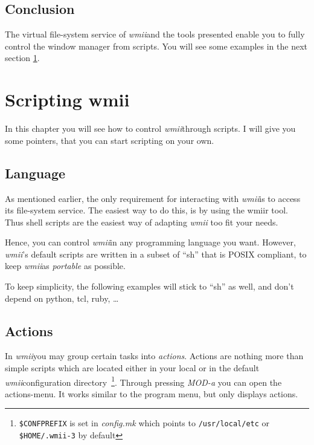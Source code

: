 \documentclass[12pt,a4paper]{article} %
\newcommand{\wmii}{\emph{wmii}}
\begin{document}
    \subsection{Conclusion}

    The virtual file-system service of \wmii and the tools presented enable
    you to fully control the window manager from scripts.
    You will see some examples in the next section
    \ref{sec:scripting}.

    \section{Scripting wmii}
    \label{sec:scripting}

    In this chapter you will see how to control \wmii through scripts. I will
    give you some pointers, that you can start scripting on your own.

    \subsection{Language}

    As mentioned earlier, the only requirement for interacting with \wmii is to
    access its file-system service. The easiest way to do this, is by using
    the wmiir tool. Thus shell scripts are the easiest way of adapting \wmii
    too fit your needs.

    Hence, you can control \wmii in any programming language you want. However,
    \wmii's default scripts are written in a subset of ``sh'' that is POSIX
    compliant, to keep \wmii as \emph{portable} as possible.
    
    To keep simplicity, the following examples will stick to ``sh'' as well,
    and don't depend on python, tcl, ruby, \dots 


    \subsection{Actions}

    In \wmii you may group certain tasks into \emph{actions}. Actions
    are nothing more than simple scripts which are located either in
    your local or in the default \wmii configuration
    directory~\footnote{ \texttt{\$CONFPREFIX} is set in
      \emph{config.mk} which points to \texttt{/usr/local/etc}
      or \texttt{\$HOME/.wmii-3} by default}.
    Through pressing \emph{MOD-a} you can open the actions-menu. It works
    similar to the program menu, but only displays actions.
\end{document}
